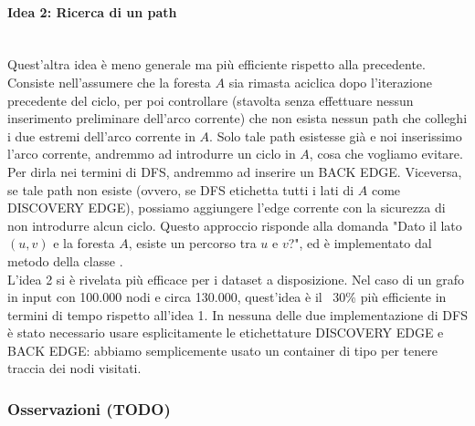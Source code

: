 \paragraph{Idea 2: Ricerca di un path}\mbox{} \\

\noindent Quest'altra idea è meno generale ma più efficiente rispetto alla precedente. Consiste nell'assumere che la foresta $A$ sia rimasta aciclica dopo l'iterazione precedente del ciclo, per poi controllare (stavolta senza effettuare nessun inserimento preliminare dell'arco corrente) che non esista nessun path che colleghi i due estremi dell'arco corrente in $A$.
Solo tale path esistesse già e noi inserissimo l'arco corrente, andremmo ad introdurre un ciclo in $A$, cosa che vogliamo evitare. Per dirla nei termini di DFS, andremmo ad inserire un BACK EDGE. Viceversa, se tale path non esiste (ovvero, se DFS etichetta tutti i lati di $A$ come DISCOVERY EDGE), possiamo aggiungere l'edge corrente con la sicurezza di non introdurre alcun ciclo.
Questo approccio risponde alla domanda "Dato il lato $(u, v)$ e la foresta $A$, esiste un percorso tra $u$ e $v$?", ed è implementato dal metodo  della classe . \\

\vspace{0.9cm}
L'idea 2 si è rivelata più efficace per i dataset a disposizione. Nel caso di un grafo in input con 100.000 nodi e circa 130.000, quest'idea è il ~30\% più efficiente in termini di tempo rispetto all'idea 1. In nessuna delle due implementazione di DFS è stato necessario usare esplicitamente le etichettature DISCOVERY EDGE e BACK EDGE: abbiamo semplicemente usato un container di tipo  per tenere traccia dei nodi visitati.

\subsubsection{Osservazioni (TODO)}

